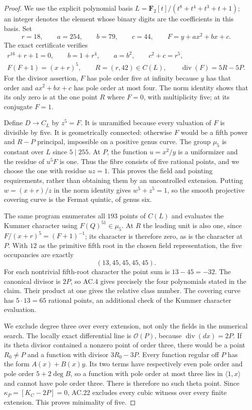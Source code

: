 \begin{proof}
We use the explicit polynomial basis
$L=\mathbf F_2[t]/(t^8+t^4+t^3+t+1)$; an integer denotes the element
whose binary digits are the coefficients in this basis.  Set
\[
            r=18,\qquad a=254,\qquad b=79,\qquad c=44,
            \qquad F=y+a x^2+b x+c.
\]
The exact certificate  verifies
\[
 \begin{gathered}
 r^{16}+r+1=0,
 \qquad b=1+r^4,\qquad a=b^2,\qquad c^2+c=r^5,\\
 F(F+1)=(x+r)^5,
 \qquad R=(r,42)\in C(L),
 \qquad \operatorname{div}(F)=5R-5P.
 \end{gathered}
\]
For the divisor assertion, $F$ has pole order five at infinity because
$y$ has that order and $a x^2+b x+c$ has pole order at most four.
The norm identity shows that its only zero is at the one point $R$
where $F=0$, with multiplicity five; at its conjugate $F=1$.

Define $D\to C_L$ by $z^5=F$.  It is unramified because every valuation
of $F$ is divisible by five.  It is geometrically connected: otherwise
$F$ would be a fifth power and $R-P$ principal, impossible on a positive
genus curve.  The group $\mu_5$ is constant over $L$ since $5\mid255$.
At $P$, the function $u=x^2/y$ is a uniformizer and the residue of
$u^5F$ is one.  Thus the fibre consists of five rational points, and we
choose the one with residue $uz=1$.  This proves the field and pointing
requirements, rather than obtaining them by an uncontrolled extension.
Putting $w=(x+r)/z$ in the norm identity gives
$w^5+z^5=1$, so the smooth projective covering curve is the Fermat
quintic, of genus six.

The same program enumerates all $193$ points of $C(L)$ and evaluates
the Kummer character using $F(Q)^{51}\in\mu_5$.
At $R$ the leading unit is also one, since
$F/(x+r)^5=(F+1)^{-1}$; its character is therefore zero, as is the
character at $P$.  With $12$ as the primitive fifth root in the chosen
field representation, the five occupancies are exactly
\[
                          (13,45,45,45,45).
\]
For each nontrivial fifth-root character the point sum is $13-45=-32$.
The canonical divisor is $2P$, so AC.4 gives precisely the four
polynomials stated in the claim.  Their product at one gives the
relative class number.  The covering curve has $5\cdot13=65$ rational
points, an additional check of the Kummer character evaluation.

We exclude degree three over every extension, not only the fields in
the numerical search.  The locally exact differential line is
$\mathcal O(P)$, because $\operatorname{div}(dx)=2P$.
If its theta divisor contained a nonzero point of order three, there
would be a point $R_0\ne P$ and a function with divisor $3R_0-3P$.
Every function regular off $P$ has the form $A(x)+B(x)y$.
Its two terms have respectively even pole order and pole order
$5+2\deg B$, so a function with pole order at most three lies in
$\langle1,x\rangle$ and cannot have pole order three.
There is therefore no such theta point.  Since
$\kappa_P=[K_C-2P]=0$, AC.22 excludes every cubic witness over every
finite extension.  This proves minimality of five.


\end{proof}
